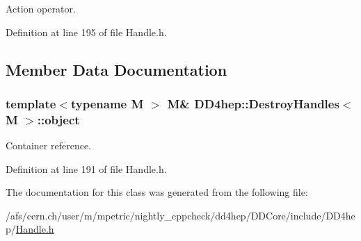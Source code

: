 Action operator. 

Definition at line 195 of file Handle.h.

\subsection{Member Data Documentation}
\hypertarget{class_d_d4hep_1_1_destroy_handles_a4398c11430a5bb66b962d45133e2d5f1}{
\subsubsection[{object}]{\setlength{\rightskip}{0pt plus 5cm}template$<$typename M $>$ M\& {\bf DD4hep::DestroyHandles}$<$ M $>$::{\bf object}}}
\label{class_d_d4hep_1_1_destroy_handles_a4398c11430a5bb66b962d45133e2d5f1}


Container reference. 

Definition at line 191 of file Handle.h.

The documentation for this class was generated from the following file:\begin{DoxyCompactItemize}
\item 
/afs/cern.ch/user/m/mpetric/nightly\_\-cppcheck/dd4hep/DDCore/include/DD4hep/\hyperlink{_handle_8h}{Handle.h}\end{DoxyCompactItemize}
